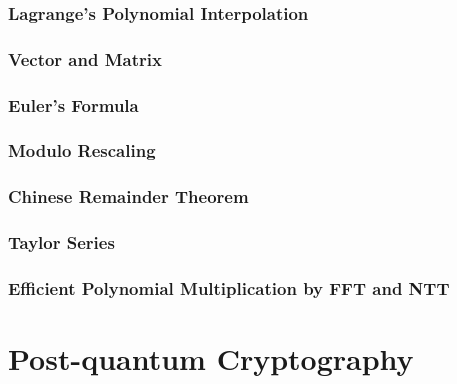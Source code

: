 \documentclass[11pt]{article}
\begin{document}
\clearpage

\section{Lagrange's Polynomial Interpolation}
\label{sec:polynomial-interpolation}


\clearpage

\section{Vector and Matrix}
\label{sec:matrix}


\clearpage

\section{Euler's Formula}
\label{sec:euler}


\clearpage

\section{Modulo Rescaling}
\label{sec:modulus-rescaling}


\clearpage

\section{Chinese Remainder Theorem}
\label{sec:chinese-remainder}


\clearpage

\section{Taylor Series}
\label{sec:taylor-series}


\clearpage



\section{Efficient Polynomial Multiplication by FFT and NTT}
\label{sec:ntt}


\clearpage





\part{Post-quantum Cryptography}
\label{part:pqc}
\end{document}
